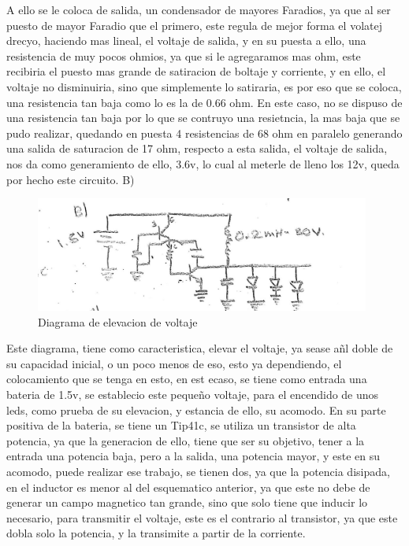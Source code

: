 \documentclass[12pt,a4paper]{article}
\begin{document}
A ello se le coloca de salida, un condensador de mayores Faradios, ya que al ser puesto de mayor Faradio que el primero, este regula de mejor forma el volatej drecyo, haciendo mas lineal, el voltaje de salida, y en su puesta a ello, una resistencia de muy pocos ohmios, ya que si le agregaramos mas ohm, este recibiria el puesto mas grande de satiracion de boltaje y corriente, y en ello, el voltaje no disminuiria, sino que simplemente lo satiraria, es por eso que se coloca, una resistencia tan baja como lo es la de 0.66 ohm. En este caso, no se dispuso de una resistencia tan baja por lo que se contruyo una resietncia, la mas baja que se pudo realizar, quedando en puesta 4 resistencias de 68 ohm en paralelo generando una salida de saturacion de 17 ohm, respecto a esta salida, el voltaje de salida, nos da como generamiento de ello, 3.6v, lo cual al meterle de lleno los 12v, queda por hecho este circuito.
\newpage
B)\\

\begin{figure}[hbtp]
\centering
\includegraphics[width=11cm]{esquema2.jpeg}
\caption{Diagrama de elevacion de voltaje}
\end{figure}

Este diagrama, tiene como caracteristica, elevar el voltaje, ya sease añl doble de su capacidad inicial, o un poco menos de eso, esto ya dependiendo, el colocamiento que se tenga en esto, en est ecaso, se tiene como entrada una bateria de 1.5v, se establecio este pequeño voltaje, para el encendido de unos leds, como prueba de su elevacion, y estancia de ello, su acomodo. En su parte positiva de la bateria, se tiene un Tip41c, se utiliza un transistor de alta potencia, ya que la generacion de ello, tiene que ser su objetivo, tener a la entrada una potencia baja, pero a la salida, una potencia mayor, y este en su acomodo, puede realizar ese trabajo, se tienen dos, ya que la potencia disipada, en el inductor es menor al del esquematico anterior, ya que este no debe de generar un campo magnetico tan grande, sino que solo tiene que inducir lo necesario, para transmitir el voltaje, este es el contrario al transistor, ya que este dobla solo la potencia, y la transimite a partir de la corriente.\\
\end{document}
